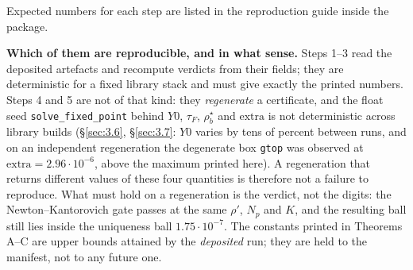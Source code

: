 Expected numbers for each step are listed in the reproduction guide inside the
package.

\textbf{Which of them are reproducible, and in what sense.} Steps 1--3 read the
deposited artefacts and recompute verdicts from their fields; they are deterministic
for a fixed library stack and must give exactly the printed numbers. Steps 4 and 5 are
not of that kind: they \emph{regenerate} a certificate, and the float seed
\texttt{solve\_\allowbreak fixed\_\allowbreak point} behind $Y0$, $\tau_{F}$,
$\rho^{\star}_{b}$ and $\mathrm{extra}$ is not deterministic across library builds
(\S\ref{sec:3.6}, \S\ref{sec:3.7}: $Y0$ varies by tens of percent between runs, and on an
independent regeneration the degenerate box \texttt{gtop} was observed at
$\mathrm{extra} = 2.96\cdot 10^{-6}$, above the maximum printed here). A regeneration
that returns different values of these four quantities is therefore not a failure to
reproduce. What must hold on a regeneration is the verdict, not the digits: the
Newton--Kantorovich gate passes at the same $\rho'$, $N_p$ and $K$, and the resulting
ball still lies inside the uniqueness ball $1.75\cdot 10^{-7}$. The constants printed in
Theorems A--C are upper bounds attained by the \emph{deposited} run; they are held to the
manifest, not to any future one.


